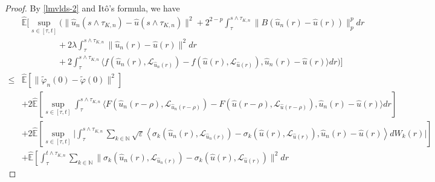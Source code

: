 \documentclass[10pt,a4paper]{amsart}
\begin{document}
\begin{proof}
 By \eqref{lmvlds-2} and It\^o's formula, we have
  \begin{align}\label{consys-6}
         & \widehat{\mathbb{E}}
           \bigg[ \sup_{s \in [\tau,t]}
                  \Big( \| \hat{u}_n(s \wedge \tau_{K,n}) - \hat{u}(s \wedge \tau_{K,n}) \|^2
                         + 2^{2-p} \int_{\tau}^{s \wedge \tau_{K,n}}
                                       \| B (\hat{u}_n(r) - \hat{u}(r)) \|_p^p dr \nonumber\\
         & \qquad\qquad \
                         + 2 \lambda \int_{\tau}^{s \wedge \tau_{K,n}} \|\hat{u}_n(r) - \hat{u}(r)\|^2 dr  \nonumber\\
         & \qquad\qquad \
                         + 2 \int_{\tau}^{s \wedge \tau_{K,n}}
                                   \langle f(\hat{u}_n(r), \mathcal{L}_{\hat{u}_n(r)})
                                            - f(\hat{u}(r), \mathcal{L}_{\hat{u}(r)}),
                                           \hat{u}_n(r) - \hat{u}(r)
                                   \rangle dr
                   \Big)
            \bigg] \nonumber\\
     \le & \widehat{\mathbb{E}}[\|\widetilde{\varphi}_n(0) - \widetilde{\varphi}(0)\|^2] \nonumber\\
          & + 2 \widehat{\mathbb{E}}
                \left[ \sup_{s \in [\tau,t]}
                       \int_{\tau}^{s \wedge \tau_{K,n}}
                          \langle F(\hat{u}_n(r-\rho), \mathcal{L}_{\hat{u}_n(r-\rho)})
                                  - F(\hat{u}(r-\rho), \mathcal{L}_{\hat{u}(r-\rho)}),
                                  \hat{u}_n(r) - \hat{u}(r)
                          \rangle dr
                \right] \nonumber\\
          & + 2 \widehat{\mathbb{E}}
                   \left[ \sup_{s \in [\tau,t]}
                          \Big| \int_{\tau}^{s \wedge \tau_{K,n}}
                                   \sum_{k \in \mathbb{N} }
                   \sqrt{\varepsilon}
                    \left\langle \sigma_k(\hat{u}_n(r),\mathcal{L}_{\hat{u}_n(r)}) - \sigma_k(\hat{u}(r),\mathcal{L}_{\hat{u}(r)}),
                                                   \hat{u}_n(r) - \hat{u}(r)
                                      \right\rangle dW_k(r)
                          \Big|
                   \right]  \nonumber\\
          & + \widehat{\mathbb{E}}
                 \left[ \int_{\tau}^{t \wedge \tau_{K,n}}
                           \sum_{k \in \mathbb{N} }
                              \|\sigma_k(\hat{u}_n(r),\mathcal{L}_{\hat{u}_n(r)}) - \sigma_k(\hat{u}(r),\mathcal{L}_{\hat{u}(r)})\|^2 dr

\end{align}
\end{proof}
\end{document}
